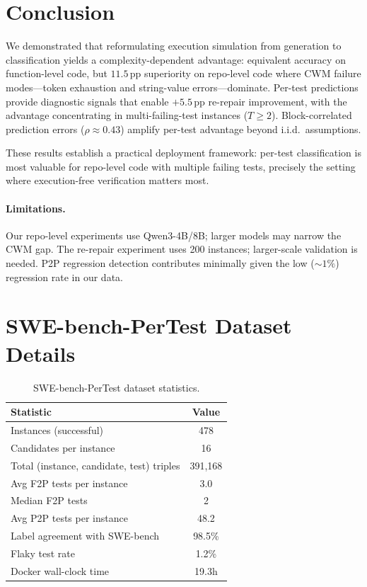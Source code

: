\documentclass[11pt,a4paper]{article}
\newcommand{\pp}{\,\text{pp}}
\begin{document}
\section{Conclusion}

We demonstrated that reformulating execution simulation from generation to classification yields a complexity-dependent advantage: equivalent accuracy on function-level code, but $11.5\pp$ superiority on repo-level code where CWM failure modes---token exhaustion and string-value errors---dominate.
Per-test predictions provide diagnostic signals that enable $+5.5\pp$ re-repair improvement, with the advantage concentrating in multi-failing-test instances ($T{\geq}2$).
Block-correlated prediction errors ($\rho{\approx}0.43$) amplify per-test advantage beyond i.i.d.\ assumptions.

These results establish a practical deployment framework: per-test classification is most valuable for repo-level code with multiple failing tests, precisely the setting where execution-free verification matters most.

\paragraph{Limitations.}
Our repo-level experiments use Qwen3-4B/8B; larger models may narrow the CWM gap.
The re-repair experiment uses 200 instances; larger-scale validation is needed.
P2P regression detection contributes minimally given the low (${\sim}1\%$) regression rate in our data.




\appendix
\section{SWE-bench-PerTest Dataset Details}

\begin{table}[h]
\centering
\small
\begin{tabular}{lc}
\toprule
\textbf{Statistic} & \textbf{Value} \\
\midrule
Instances (successful) & 478 \\
Candidates per instance & 16 \\
Total (instance, candidate, test) triples & 391,168 \\
Avg F2P tests per instance & 3.0 \\
Median F2P tests & 2 \\
Avg P2P tests per instance & 48.2 \\
Label agreement with SWE-bench & 98.5\% \\
Flaky test rate & 1.2\% \\
Docker wall-clock time & 19.3h \\
\bottomrule
\end{tabular}
\caption{SWE-bench-PerTest dataset statistics.}
\label{tab:dataset}
\end{table}
\end{document}
